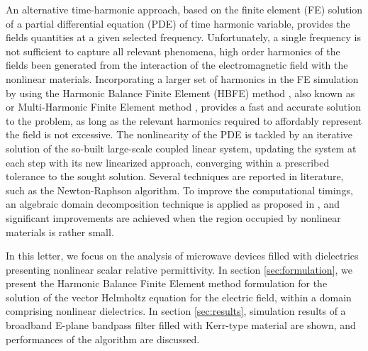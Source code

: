 \documentclass[journal]{IEEEtran}
\begin{document}
An alternative time-harmonic approach, based on the finite element (FE) solution of a partial differential equation (PDE) of time harmonic variable, provides the fields quantities at a given selected frequency. Unfortunately, a single frequency is not sufficient to capture all relevant phenomena, high order harmonics of the fields been generated from the interaction of the electromagnetic field with the nonlinear materials. Incorporating a larger set of harmonics in the FE simulation by using the Harmonic Balance Finite Element (HBFE) method \cite{Yamada1988,Yamada1989}, also known as or Multi-Harmonic Finite Element method \cite{Copeland2010, Bachinger2005, deGersem2001, Kolmbauer2009}, provides a fast and accurate solution to the problem, as long as the relevant harmonics required to affordably represent the field is not excessive. The nonlinearity of the PDE is tackled by an iterative solution of the so-built large-scale coupled linear system, updating the system at each step with its new linearized approach, converging within a prescribed tolerance to the sought solution. Several techniques are reported in literature, such as the Newton-Raphson algorithm. To improve the computational timings, an algebraic domain decomposition technique is applied as proposed in \cite{Guarnieri2010}, and significant improvements are achieved when the region occupied by nonlinear materials is rather small.

\par In this letter, we focus on the analysis of microwave devices filled with dielectrics presenting nonlinear scalar relative permittivity. 
In section \ref{sec:formulation}, we present the Harmonic Balance Finite Element method formulation for the solution of the vector Helmholtz equation for the electric field, within a domain comprising nonlinear dielectrics. In section \ref{sec:results}, simulation results of a broadband E-plane bandpass filter filled with Kerr-type material are shown, and performances of the algorithm are discussed.
\end{document}
